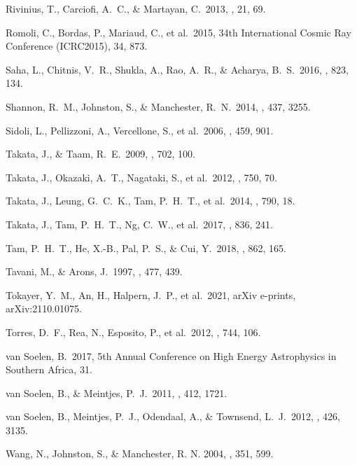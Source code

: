 \documentclass{aa}
\begin{document}
\begin{thebibliography}{}
 Rivinius, T., Carciofi, A.~C., \& Martayan, C.\ 2013, \aapr, 21, 69.

 Romoli, C., Bordas, P., Mariaud, C., et al.\ 2015, 34th International Cosmic Ray Conference (ICRC2015), 34, 873.

 Saha, L., Chitnis, V.~R., Shukla, A., Rao, A.~R., \& Acharya, B.~S.\ 2016, \apj, 823, 134.

 Shannon, R.~M., Johnston, S., \& Manchester, R.~N.\ 2014, \mnras, 437, 3255.

 Sidoli, L., Pellizzoni, A., Vercellone, S., et al.\ 2006, \aap, 459, 901.

 Takata, J., \& Taam, R.~E.\ 2009, \apj, 702, 100.

 Takata, J., Okazaki, A.~T., Nagataki, S., et al.\ 2012, \apj, 750, 70.

 Takata, J., Leung, G.~C.~K., Tam, P.~H.~T., et al.\ 2014, \apj, 790, 18.

 Takata, J., Tam, P.~H.~T., Ng, C.~W., et al.\ 2017, \apj, 836, 241.

 Tam, P.~H.~T., He, X.-B., Pal, P.~S., \& Cui, Y.\ 2018, \apj, 862, 165.

 Tavani, M., \& Arons, J.\ 1997, \apj, 477, 439.

 Tokayer, Y.~M., An, H., Halpern, J.~P., et al.\ 2021, arXiv e-prints, arXiv:2110.01075.

 Torres, D.~F., Rea, N., Esposito, P., et al.\ 2012, \apj, 744, 106.

 van Soelen, B.\ 2017, 5th Annual Conference on High Energy Astrophysics in Southern Africa, 31.

 van Soelen, B., \& Meintjes, P.~J.\ 2011, \mnras, 412, 1721.

 van Soelen, B., Meintjes, P.~J., Odendaal, A., \& Townsend, L.~J.\ 2012, \mnras, 426, 3135.

 Wang, N., Johnston, S., \& Manchester, R. N. 2004, \mnras, 351, 599.


\end{thebibliography}
\end{document}
